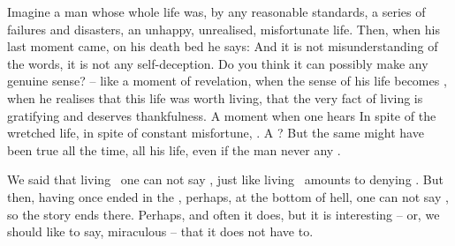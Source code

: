 Imagine a man whose whole life was, by any reasonable standards, a series of
failures and disasters, an unhappy, unrealised, misfortunate life.  Then, when
his last moment came, on his death bed he says:  And it is not misunderstanding of the words, it is not any
self-deception.  Do you think it can possibly make any genuine sense? 
-- like a moment of {revelation}, when the  sense of his life
becomes , when he realises that this life was worth living, that
the very fact of living is gratifying and deserves thankfulness.  A moment when
one hears  In spite of the wretched life, in spite of constant
misfortune, . A ? But the same might have been true all the time, all his life, even if
the man never  any  .


\pa
We said that living \No\ one can not say \yes, just like living \yes\ amounts to
denying \No. But then, having once ended in the \No, perhaps, at the bottom of
hell, one can not say \Yes, so the story ends there. Perhaps, and often it does, but
it is interesting -- or, we should like to say, miraculous -- that it does not have to. 


